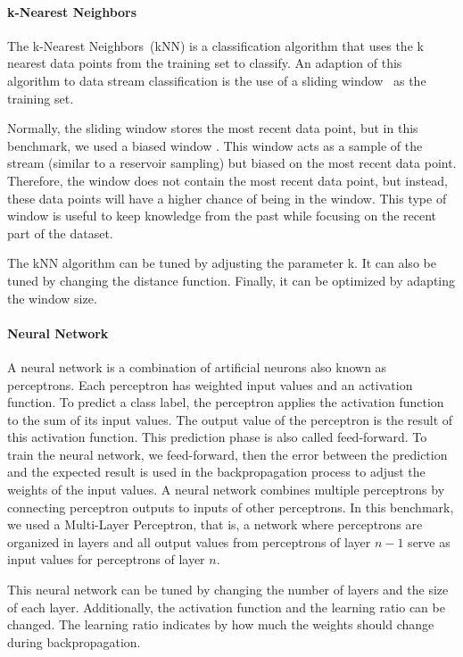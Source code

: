 \paragraph{k-Nearest Neighbors~\cite{biased_reservoir_sampling}}
The k-Nearest Neighbors~(kNN) is a classification
algorithm that uses the k nearest data points from
the training set to classify.  An adaption of this
algorithm to data stream classification is the use
of a sliding window~\cite{Mining_Massive_Datasets}
as the training set.

Normally, the sliding window stores the most
recent data point, but in this benchmark, we used
a biased window . This window acts as a sample of
the stream (similar to a reservoir sampling) but
biased on the most recent data point.  Therefore,
the window does not contain the most recent data
point, but instead, these data points will have a
higher chance of being in the window.  This type
of window is useful to keep knowledge from the
past while focusing on the recent part of the
dataset.

The kNN algorithm can be tuned by adjusting the
parameter k. It can also be tuned by changing the
distance function. Finally, it can be optimized by
adapting the window size.

\paragraph{Neural Network}
A neural network is a combination of artificial
neurons also known as perceptrons. Each
perceptron has weighted input values and an
activation function. To predict a class label, the
perceptron applies the activation function to the sum
of its input values. The output
value of the perceptron is the result of this
activation function. This prediction phase is also
called feed-forward. To train the neural network,
we feed-forward, then the error between the
prediction and the expected result is used in the
backpropagation process to adjust the weights of
the input values.  A neural network combines
multiple perceptrons by connecting perceptron outputs
to inputs of other perceptrons.  In
this benchmark, we used a Multi-Layer Perceptron, 
that is, a network where perceptrons are organized in
layers and all output
values from perceptrons of layer $n-1$ serve as
input values for perceptrons of layer $n$. 

This neural network can be tuned by changing the
number of layers and the size of each layer.
Additionally, the activation function and the
learning ratio can be changed. The learning ratio
indicates by how much the weights should change
during backpropagation.

